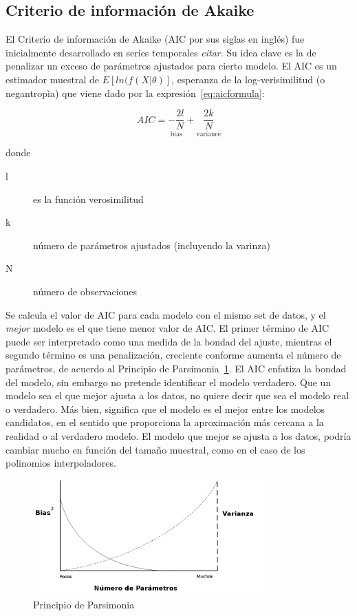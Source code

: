 \subsection{Criterio de información de Akaike}
El Criterio de información de Akaike (AIC por sus siglas en inglés) fue
inicialmente desarrollado en series temporales \emph{citar}. Su idea clave es
la de penalizar un exceso de parámetros ajustados para cierto modelo. El AIC es
un estimador muestral de $E[ln(f(X|\theta)]$, esperanza de la log-verisimilitud
(o negantropìa) que viene dado por la expresión~\ref{eq:aicformula}:

\begin{equation}
\label{eq:aicformula}
AIC = \underset{\text{bias}}{-\frac{2l}{N}} + 
\underset{\text{variance}}{\frac{2k}{N}}
\end{equation}

\noindent donde

\begin{description}
\item[l] es la función verosimilitud
\item[k] número de parámetros ajustados (incluyendo la varinza)
\item[N] número de observaciones
\end{description}

Se calcula el valor de AIC para cada modelo con el mismo set de datos, y
el \emph{mejor} modelo es el que tiene menor valor de AIC.
El primer término de AIC puede ser interpretado como una medida de la bondad
del ajuste, mientras el segundo término es una penalización, creciente conforme
aumenta el número de parámetros, de acuerdo al Principio de
Parsimonia~\ref{fig:parsimony}. El AIC enfatiza la bondad del modelo, sin
embargo no pretende identificar el modelo verdadero. Que un modelo sea el que
mejor ajusta a los datos, no quiere decir que sea el modelo real o verdadero.
Más bien, significa que el modelo es el mejor entre los modelos candidatos, en
el sentido que proporciona la aproximación más cercana a la realidad o al
verdadero modelo. El modelo que mejor se ajusta a los datos, podría cambiar
mucho en función del tamaño muestral, como en el caso de los polinomios
interpoladores.

\begin{figure}[h!t]
    \begin{center}
        \includegraphics[width=0.8\textwidth]{images/parsimony}
        \caption{Principio de Parsimonia}
        \label{fig:parsimony}
    \end{center}
\end{figure}

